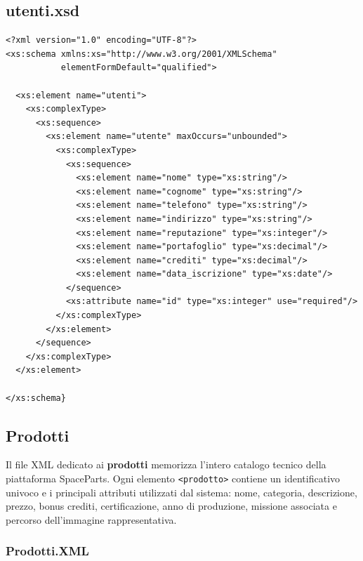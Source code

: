 \documentclass[a4paper,12pt]{report}
\begin{document}
\subsection*{utenti.xsd}
{\footnotesize
\begin{lstlisting}
<?xml version="1.0" encoding="UTF-8"?>
<xs:schema xmlns:xs="http://www.w3.org/2001/XMLSchema"
           elementFormDefault="qualified">

  <xs:element name="utenti">
    <xs:complexType>
      <xs:sequence>
        <xs:element name="utente" maxOccurs="unbounded">
          <xs:complexType>
            <xs:sequence>
              <xs:element name="nome" type="xs:string"/>
              <xs:element name="cognome" type="xs:string"/>
              <xs:element name="telefono" type="xs:string"/>
              <xs:element name="indirizzo" type="xs:string"/>
              <xs:element name="reputazione" type="xs:integer"/>
              <xs:element name="portafoglio" type="xs:decimal"/>
              <xs:element name="crediti" type="xs:decimal"/>
              <xs:element name="data_iscrizione" type="xs:date"/>
            </sequence>
            <xs:attribute name="id" type="xs:integer" use="required"/>
          </xs:complexType>
        </xs:element>
      </sequence>
    </xs:complexType>
  </xs:element>

</xs:schema}
\end{lstlisting}}


\subsection*{Prodotti}
\label{sec:catalogo}
Il file XML dedicato ai \textbf{prodotti} memorizza l’intero catalogo tecnico della piattaforma SpaceParts.  
Ogni elemento \texttt{<prodotto>} contiene un identificativo univoco e i principali attributi utilizzati dal sistema:
nome, categoria, descrizione, prezzo, bonus crediti, certificazione, anno di produzione, missione associata e percorso dell’immagine rappresentativa.  


\subsubsection*{Prodotti.XML}
\end{document}

